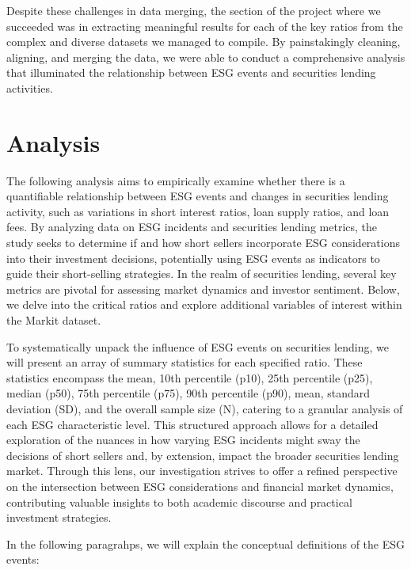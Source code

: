 Despite these challenges in data merging, the section of the project where we succeeded was in extracting meaningful results for each of the key ratios from the complex and diverse datasets we managed to compile. By painstakingly cleaning, aligning, and merging the data, we were able to conduct a comprehensive analysis that illuminated the relationship between ESG events and securities lending activities.



\newpage
\section{Analysis}

The following analysis aims to empirically examine whether there is a quantifiable relationship between ESG events and changes in securities lending activity, such as variations in short interest ratios, loan supply ratios, and loan fees. By analyzing data on ESG incidents and securities lending metrics, the study seeks to determine if and how short sellers incorporate ESG considerations into their investment decisions, potentially using ESG events as indicators to guide their short-selling strategies.  In the realm of securities lending, several key metrics are pivotal for assessing market dynamics and investor sentiment. Below, we delve into the critical ratios and explore additional variables of interest within the Markit dataset.

To systematically unpack the influence of ESG events on securities lending, we will present an array of summary statistics for each specified ratio. These statistics encompass the mean, 10th percentile (p10), 25th percentile (p25), median (p50), 75th percentile (p75), 90th percentile (p90), mean, standard deviation (SD), and the overall sample size (N), catering to a granular analysis of each ESG characteristic level. This structured approach allows for a detailed exploration of the nuances in how varying ESG incidents might sway the decisions of short sellers and, by extension, impact the broader securities lending market. Through this lens, our investigation strives to offer a refined perspective on the intersection between ESG considerations and financial market dynamics, contributing valuable insights to both academic discourse and practical investment strategies.

In the following paragrahps, we will explain the conceptual definitions of the ESG events:

